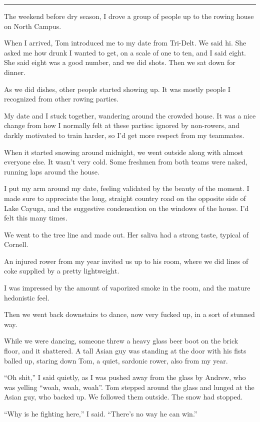\plainfancybreak{12pt}{2}{}

The weekend before dry season, I drove a group of people up to the rowing house
on North Campus.

When I arrived, Tom introduced me to my date from Tri-Delt.  We said hi.  She
asked me how drunk I wanted to get, on a scale of one to ten, and I said eight.
She said eight was a good number, and we did shots.  Then we sat down for
dinner.

As we did dishes, other people started showing up.  It was mostly people I
recognized from other rowing parties.  

My date and I stuck together, wandering around the crowded house. It was a nice
change from how I normally felt at these parties: ignored by non-rowers, and
darkly motivated to train harder, so I'd get more respect from my teammates.

When it started snowing around midnight, we went outside along with almost
everyone else.  It wasn't very cold.  Some freshmen from both teams were naked,
running laps around the house.

I put my arm around my date, feeling validated by the beauty of the moment.   I
made sure to appreciate the long, straight country road on the opposite side of
Lake Cayuga, and the suggestive condensation on the windows of the house.  I'd
felt this many times. 

We went to the tree line and made out.  Her saliva had a strong taste, typical
of Cornell.

An injured rower from my year invited us up to his room, where we did lines of
coke supplied by a pretty lightweight. 

I was impressed by the amount of vaporized smoke in the room, and the mature
hedonistic feel.  

Then we went back downstairs to dance, now very fucked up, in a sort of stunned
way.  

While we were dancing, someone threw a heavy glass beer boot on the brick floor,
and it shattered.  A tall Asian guy was standing at the door with his fists
balled up, staring down Tom, a quiet, sardonic rower, also from my year.  

``Oh shit,'' I said quietly, as I was pushed away from the glass by Andrew, who
was yelling ``woah, woah, woah''.  Tom stepped around the glass and lunged at the
Asian guy, who backed up. We followed them outside.  The snow had stopped.

``Why is he fighting here,'' I said.  ``There's no way he can win.'' 

